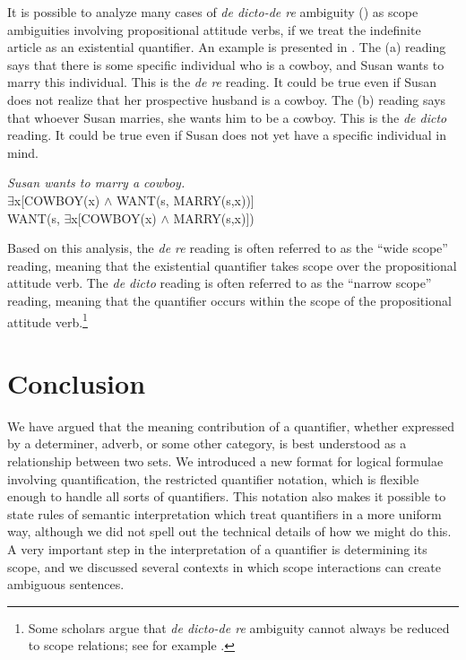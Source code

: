 It is possible to analyze many cases of \textit{de dicto-de re} ambiguity () as scope ambiguities involving propositional attitude verbs, if we treat the indefinite article as an existential quantifier. An example is presented in . The (a) reading says that there is some specific individual who is a cowboy, and Susan wants to marry this individual. This is the \textit{de re} reading. It could be true even if Susan does not realize that her prospective husband is a cowboy. The (b) reading says that whoever Susan marries, she wants him to be a cowboy. This is the \textit{de dicto} reading. It could be true even if Susan does not yet have a specific individual in mind.


\ea \label{ex:14.40}
\textit{Susan wants to marry a cowboy.}\\
\ea  ${\exists}$x[COWBOY(x) $\wedge$ WANT(s, MARRY(s,x))]\\
\ex  WANT(s, ${\exists}$x[COWBOY(x) $\wedge$ MARRY(s,x)])
                       \z
\z


Based on this analysis, the \textit{de re} reading is often referred to as the “wide scope” reading, meaning that the existential quantifier takes scope over the propositional attitude verb. The \textit{de dicto} reading is often referred to as the “narrow scope” reading, meaning that the quantifier occurs within the scope of the propositional attitude verb.\footnote{Some scholars argue that \textit{de dicto-de re} ambiguity cannot always be reduced to scope relations; see for example \citet{FodorSag1982}.}


\section{Conclusion}\label{sec:14.6}

We have argued that the meaning contribution of a quantifier, whether expressed by a determiner, adverb, or some other category, is best understood as a relationship between two sets. We introduced a new format for logical formulae involving quantification, the restricted quantifier notation, which is flexible enough to handle all sorts of quantifiers. This notation also makes it possible to state rules of semantic interpretation which treat quantifiers in a more uniform way, although we did not spell out the technical details of how we might do this. A very important step in the interpretation of a quantifier is determining its scope, and we discussed several contexts in which scope interactions can create ambiguous sentences.



